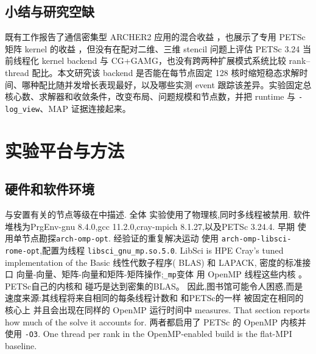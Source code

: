 \documentclass[11pt,a4paper,oneside]{report}
\begin{document}
\section{小结与研究空缺}
\label{sec:gap}
既有工作报告了通信密集型 ARCHER2 应用的混合收益 \cite{judge2022mpiopenmp}，也展示了专用 PETSc
矩阵 kernel 的收益 \cite{lange_petsc_hybrid}，但没有在配对二维、三维 stencil 问题上评估 PETSc 3.24
当前线程化 kernel backend 与 CG+GAMG，也没有跨两种扩展模式系统比较 rank--thread 配比。本文研究该
backend 是否能在每节点固定 128 核时缩短稳态求解时间、哪种配比随并发增长表现最好，以及哪些实测 event
跟踪该差异。实验固定总核心数、求解器和收敛条件，改变布局、问题规模和节点数，并把 runtime 与
\texttt{-log\_view}、MAP 证据连接起来。

\chapter{实验平台与方法}
\label{ch:methodology}

\section{硬件和软件环境}
\label{sec:env}
与安置有关的节点等级在中描述. 全体
实验使用了物理核,同时多线程被禁用. 软件
堆栈为PrgEnv-gnu 8.4.0,gcc 11.2.0,cray-mpich 8.1.27,以及PETSc 3.24.4. 早期
使用单节点勘探\texttt{arch-omp-opt}. 经验证的重复解决运动
使用 \texttt{arch-omp-libsci-rome-opt},配置为线程
\texttt{libsci\_gnu\_mp.so.5.0}. LibSci is HPE Cray's tuned implementation of the Basic
线性代数子程序( BLAS) 和 LAPACK, 密度的标准接口
向量-向量、矩阵-向量和矩阵-矩阵操作;\texttt{\_mp}变体
用 OpenMP 线程这些内核 。 PETSc自己的内核和
碰巧是达到密集的BLAS。 因此,图书馆可能令人困惑,而是
速度来源:其线程将来自相同的每条线程计数和
和PETSc的一样 被固定在相同的核心上 并且会出现在同样的 OpenMP 运行时间中
 measures. That section reports how much of the solve it accounts for.
两者都启用了 PETSc 的 OpenMP 内核并使用
\texttt{-O3}. One thread per rank in the OpenMP-enabled build is the flat-MPI baseline.
\end{document}
